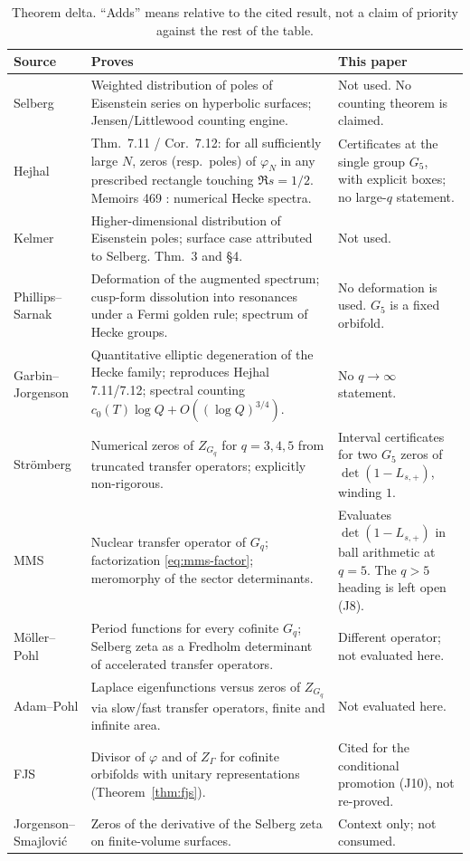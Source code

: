 \documentclass[11pt]{amsart}
\theoremstyle{definition}
\theoremstyle{remark}
\newcommand{\Gq}{G_q}
\newcommand{\Zq}{Z_{G_q}}
\newcommand{\detp}{\det(1-L_{s,+})}
\begin{document}
\begin{table}[t]
\centering
\small
\caption{Theorem delta. ``Adds'' means relative to the cited result,
not a claim of priority against the rest of the table.}
\label{tab:delta}
\begin{tabular}{@{}>{\raggedright\arraybackslash}p{}
>{\raggedright\arraybackslash}p{}
>{\raggedright\arraybackslash}p{}@{}}
\hline
Source & Proves & This paper \\
\hline
Selberg \cite{Selberg1990} &
Weighted distribution of poles of Eisenstein series on hyperbolic
surfaces; Jensen/Littlewood counting engine. &
Not used. No counting theorem is claimed. \\
Hejhal \cite{Hejhal1983} &
Thm.\ 7.11 / Cor.\ 7.12: for all sufficiently large $N$, zeros
(resp.\ poles) of $\varphi_N$ in any prescribed rectangle touching
$\Re s=1/2$. Memoirs 469 \cite{Hejhal1992}: numerical Hecke spectra.
&
Certificates at the single group $G_5$, with explicit boxes; no
large-$q$ statement. \\
Kelmer \cite{Kelmer2015} &
Higher-dimensional distribution of Eisenstein poles; surface case
attributed to Selberg. Thm.\ 3 and \S4. &
Not used. \\
Phillips--Sarnak \cite{PhillipsSarnak1985,PhillipsSarnak1992,PhillipsSarnakHecke} &
Deformation of the augmented spectrum; cusp-form dissolution into
resonances under a Fermi golden rule; spectrum of Hecke groups. &
No deformation is used. $G_5$ is a fixed orbifold. \\
Garbin--Jorgenson \cite{GarbinJorgenson2018} &
Quantitative elliptic degeneration of the Hecke family; reproduces
Hejhal 7.11/7.12; spectral counting $c_0(T)\log Q+O((\log Q)^{3/4})$.
&
No $q\to\infty$ statement. \\
Str\"omberg \cite{Stromberg2009} &
Numerical zeros of $\Zq$ for $q=3,4,5$ from truncated transfer
operators; explicitly non-rigorous. &
Interval certificates for two $G_5$ zeros of $\detp$, winding $1$. \\
MMS \cite{MMS2012} &
Nuclear transfer operator of $\Gq$; factorization
\eqref{eq:mms-factor}; meromorphy of the sector determinants. &
Evaluates $\detp$ in ball arithmetic at $q=5$. The $q>5$ heading
is left open (J8). \\
M\"oller--Pohl \cite{MoellerPohl2013} &
Period functions for every cofinite $\Gq$; Selberg zeta as a
Fredholm determinant of accelerated transfer operators. &
Different operator; not evaluated here. \\
Adam--Pohl \cite{AdamPohl2020} &
Laplace eigenfunctions versus zeros of $\Zq$ via slow/fast
transfer operators, finite and infinite area. &
Not evaluated here. \\
FJS \cite{FJS2021} &
Divisor of $\varphi$ and of $Z_\Gamma$ for cofinite orbifolds
with unitary representations (Theorem~\ref{thm:fjs}). &
Cited for the conditional promotion (J10), not re-proved. \\
Jorgenson--Smajlovi\'c \cite{JorgensonSmajlovic2017} &
Zeros of the derivative of the Selberg zeta on finite-volume
surfaces. &
Context only; not consumed. \\
\hline
\end{tabular}
\end{table}
\end{document}
